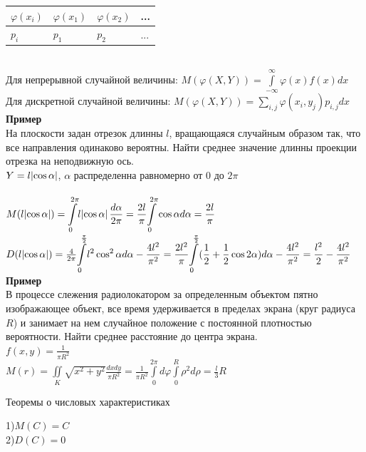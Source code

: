 \documentclass[russian, 12pt, fleqn,x11names]{article}
\begin{document}
\begin{tabular}[b]{ | l | l |  l | l | }
\hline
$\varphi(x_i)$&$\varphi(x_1)$&$\varphi(x_2)$&...\\
\hline
$p_i$&$p_1$&$p_2$&...\\
\hline
\end{tabular}\\
Для непрерывной  случайной величины: $M(\varphi(X, Y)) = \displaystyle{\int \limits _{-\infty}^{\infty} } \varphi(x) f(x) dx$\\
Для дискретной случайной  величины: $M(\varphi(X, Y)) = \displaystyle{\sum \limits _{i,j}^{} } \varphi(x_i, y_j) p_{i, j}  dx$\\
\textbf{Пример} \\
На плоскости задан отрезок длинны $l$, вращающаяся случайным образом так, что все направления одинаково вероятны. Найти среднее значение длинны проекции отрезка на неподвижную ось.\\
$Y = l \abs{\cos \alpha}$, $\alpha$ распределенна равномерно от 0 до $2\pi$\\
\\
$M(l\abs{\cos \alpha}) = \displaystyle{\int \limits_{0}^{2\pi}} l\abs{\cos \alpha} \frac{d\alpha}{2\pi}=\frac{2l}{\pi} \displaystyle{\int \limits_{0}^{2\pi}} \cos \alpha  d\alpha = \frac{2l}{\pi}$\\
$D(l\abs{\cos \alpha}) = \frac{4}{2\pi}  \displaystyle{\int \limits_{0}^{\frac{\pi}{2}}} l^2\cos^2 \alpha d\alpha  - \frac {4l^2}{\pi^2}= \frac{2l^2}{\pi} \displaystyle{\int \limits_{0}^{\frac{\pi}{2}}} (\frac{1}{2} + \frac{1}{2} \cos 2\alpha) d\alpha - \frac{4l^2}{\pi^2} = \frac{l^2}{2} - \frac{4l^2}{\pi^2}$\\
\textbf{Пример}\\ В процессе слежения радиолокатором за определенным объектом пятно изображающее объект, все время удерживается в пределах экрана (круг радиуса $R$)  и занимает на нем случайное положение с постоянной плотностью вероятности. Найти среднее расстояние до центра экрана.\\
$f(x, y) = \frac{1}{\pi R^2}$\\
$M(r) = \displaystyle{\iint\limits_{K}} \sqrt{x^2+y^2}\frac{dxdy}{\pi R^2} = \frac{1}{\pi R^2} \displaystyle{\int\limits_{0}^{2\pi}} d \varphi \displaystyle{\int\limits_{0}^{R}} \rho^2 d \rho = \frac{l}{3} R$
\begin{center}
$\textbf{Теоремы о числовых характеристиках}$
\end{center}
1)$M(C) = C$\\
2)$D(C) = 0$\\
\end{document}
